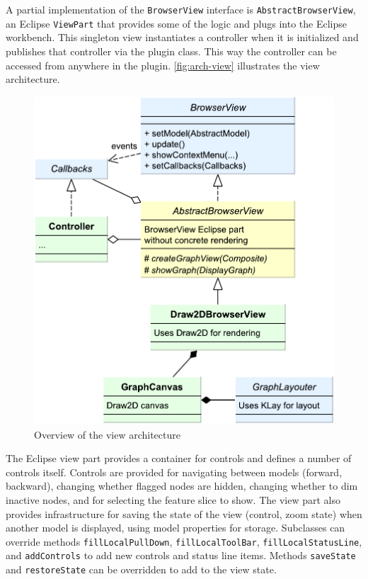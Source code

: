 A partial implementation of the \lstinline|BrowserView| interface is \lstinline|AbstractBrowserView|, an Eclipse 
\lstinline|ViewPart| that provides some of the logic and plugs into the Eclipse workbench. This singleton view 
instantiates a controller when it is initialized and publishes that controller via the plugin class. This way the 
controller can be accessed from anywhere in the plugin. \autoref{fig:arch-view} illustrates the view architecture.

\begin{figure}[htb]
  \centering
    \includegraphics[scale=0.65]{bilder/arch-view}
  \caption{Overview of the view architecture}
  \label{fig:arch-view}
\end{figure}

The Eclipse view part provides a container for controls and defines a number of controls itself. Controls are provided 
for navigating between models (forward, backward), changing whether flagged nodes are hidden, changing whether to dim 
inactive nodes, and for selecting the feature slice to show. The view part also provides infrastructure for saving the 
state of the view (control, zoom state) when another model is displayed, using model properties for storage. Subclasses 
can override methods \lstinline|fillLocalPullDown|, \lstinline|fillLocalToolBar|, \lstinline|fillLocalStatusLine|, and 
\lstinline|addControls| to add new controls and status line items. Methods \lstinline|saveState| and 
\lstinline|restoreState| can be overridden to add to the view state.

